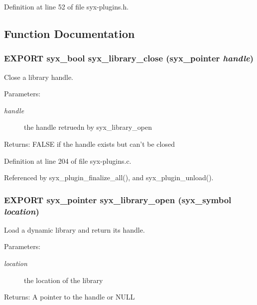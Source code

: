 Definition at line 52 of file syx-plugins.h.

\subsection{Function Documentation}
\hypertarget{syx-plugins_8h_2a3ccc043c4868935df503cac3dba4fe}{
\subsubsection{\setlength{\rightskip}{0pt plus 5cm}EXPORT {\bf syx\_\-bool} syx\_\-library\_\-close ({\bf syx\_\-pointer} {\em handle})}}
\label{syx-plugins_8h_2a3ccc043c4868935df503cac3dba4fe}


Close a library handle.

\begin{Desc}
\item[Parameters:]
\begin{description}
\item[{\em handle}]the handle retruedn by syx\_\-library\_\-open \end{description}
\end{Desc}
\begin{Desc}
\item[Returns:]FALSE if the handle exists but can't be closed \end{Desc}


Definition at line 204 of file syx-plugins.c.

Referenced by syx\_\-plugin\_\-finalize\_\-all(), and syx\_\-plugin\_\-unload().\hypertarget{syx-plugins_8h_6b48deab36f556a73b02453cf5ed9b6e}{
\subsubsection{\setlength{\rightskip}{0pt plus 5cm}EXPORT {\bf syx\_\-pointer} syx\_\-library\_\-open ({\bf syx\_\-symbol} {\em location})}}
\label{syx-plugins_8h_6b48deab36f556a73b02453cf5ed9b6e}


Load a dynamic library and return its handle.

\begin{Desc}
\item[Parameters:]
\begin{description}
\item[{\em location}]the location of the library \end{description}
\end{Desc}
\begin{Desc}
\item[Returns:]A pointer to the handle or NULL \end{Desc}



